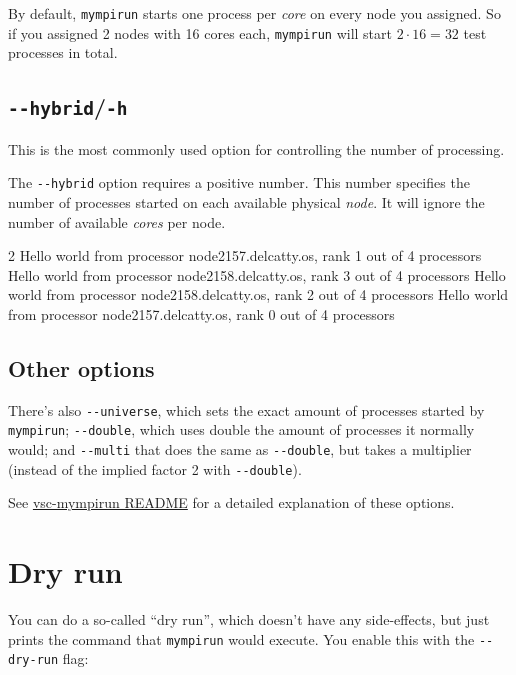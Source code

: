 By default, \lstinline|mympirun| starts one process per \emph{core} on every node you assigned.
So if you assigned 2 nodes with 16 cores each, \lstinline|mympirun| will
start $2\cdot16=32$ test processes in total.

\subsection{\texttt{-{}-hybrid}/\texttt{-h}}

This is the most commonly used option for controlling the number of processing.

The \lstinline|--hybrid| option requires a positive number. This number specifies
the number of processes started on each available physical \emph{node}. It will ignore
the number of available \emph{cores} per node.

\begin{prompt}
2
Hello world from processor node2157.delcatty.os, rank 1 out of 4 processors
Hello world from processor node2158.delcatty.os, rank 3 out of 4 processors
Hello world from processor node2158.delcatty.os, rank 2 out of 4 processors
Hello world from processor node2157.delcatty.os, rank 0 out of 4 processors
\end{prompt}

\subsection{Other options}

There's also \lstinline|--universe|, which sets the exact amount of processes started by \lstinline|mympirun|;
\lstinline|--double|, which uses double the amount of processes it normally would;
and \lstinline|--multi| that does the same as \lstinline|--double|, but takes a multiplier
(instead of the implied factor 2 with \lstinline|--double|).

See \href{https://github.com/hpcugent/vsc-mympirun/blob/master/README.md}{vsc-mympirun README}
for a detailed explanation of these options.

\section{Dry run}

You can do a so-called ``dry run'', which doesn't have any side-effects, but just
prints the command that \lstinline|mympirun| would execute. You enable this with the \lstinline|--dry-run| flag:

